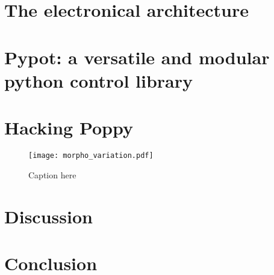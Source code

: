 \section{The electronical architecture} %

\section{Pypot: a versatile and modular python control library}

\section{Hacking Poppy} %

\begin{figure}[tb]
    \begin{center}
        \texttt{[image: morpho\_variation.pdf]}
    \end{center}
    \caption{Caption here}
    \label{fig:figure1}
\end{figure}


\section{Discussion}

\section{Conclusion}

